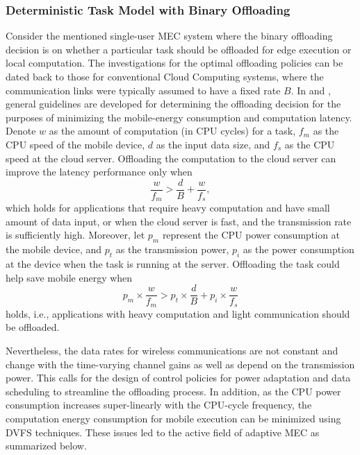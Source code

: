\documentclass[journal]{IEEEtran}
\begin{document}
\subsubsection{\textbf{Deterministic Task Model with Binary Offloading}} Consider the mentioned  single-user MEC system where the binary offloading decision is on whether a particular task should be offloaded for edge execution or local computation.   The investigations for the optimal  offloading policies can be dated back to  those for conventional Cloud Computing systems, where the communication links were typically assumed to have a fixed rate  $B$. In  \cite{KumarCompt1004} and \cite{KumarMPA1004}, general guidelines are developed for determining the offloading decision for the purposes of minimizing the mobile-energy consumption and computation  latency. Denote $w$ as the amount of computation (in CPU cycles) for a task, $f_{m}$ as the CPU speed of the mobile device, $d$ as the input data size, and $f_{s}$ as the CPU speed at the cloud server. Offloading the computation to the cloud server can improve the latency performance only when
\begin{equation}
\frac{w}{f_{m}}> \frac{d}{B} + \frac{w}{f_{s}},
\label{SecIII:OffloadingLatency}
\end{equation}
which holds for applications that require heavy computation and have small amount of data input, or when the cloud server is fast, and the transmission rate  is sufficiently high. Moreover, let  $p_{m}$ represent the CPU power consumption at the mobile device, and $p_{t}$ as the transmission  power, $p_{i}$ as the power consumption at the device when the task is running at the server. Offloading the task could help save mobile energy when
\begin{equation}
p_{m}\times \frac{w}{f_{m}} > p_{t}\times \frac{d}{B} + p_{i} \times \frac{w}{f_{s}}
\label{SecIII:OffloadingEnergy}
\end{equation}
holds, i.e., applications with heavy computation and light communication should be offloaded.

Nevertheless, the data  rates for wireless communications are not constant and change with the time-varying channel gains as well as depend on the transmission power. This calls  for the design of control policies for  power adaptation and data scheduling to streamline the offloading process. In addition, as the CPU power consumption increases super-linearly with the CPU-cycle frequency, the computation energy consumption for mobile execution can be minimized using DVFS techniques. These issues led to the active field of adaptive MEC as summarized below.
\end{document}
